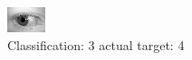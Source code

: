 \begin{figure}[h!]
\begin{center}
\includegraphics[width=0.60\columnwidth]{figures/ID754_class_3_target_4.png}
\end{center}
\caption{ Classification: 3 actual target: 4}
\label{fig:ID754_class_3_target_4}
\end{figure}
